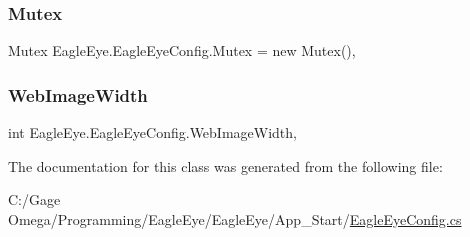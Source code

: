 \subsubsection{\texorpdfstring{Mutex}{Mutex}}
{\footnotesize\ttfamily Mutex Eagle\+Eye.\+Eagle\+Eye\+Config.\+Mutex = new Mutex()\hspace{0.3cm}{\ttfamily [static]}, {\ttfamily [get]}}

\mbox{\label{class_eagle_eye_1_1_eagle_eye_config_a0b439fa02236aa8c7aa11eeb66b1e80c}} 
\subsubsection{\texorpdfstring{WebImageWidth}{WebImageWidth}}
{\footnotesize\ttfamily int Eagle\+Eye.\+Eagle\+Eye\+Config.\+Web\+Image\+Width\hspace{0.3cm}{\ttfamily [static]}, {\ttfamily [get]}}



The documentation for this class was generated from the following file\+:\begin{DoxyCompactItemize}
\item 
C\+:/\+Gage Omega/\+Programming/\+Eagle\+Eye/\+Eagle\+Eye/\+App\+\_\+\+Start/\mbox{\hyperlink{_eagle_eye_config_8cs}{Eagle\+Eye\+Config.\+cs}}\end{DoxyCompactItemize}
